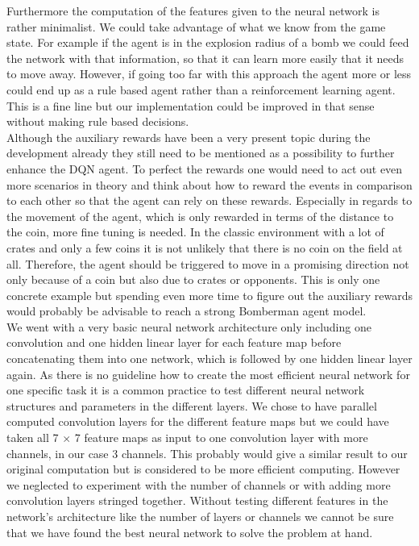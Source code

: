Furthermore the computation of the features given to the neural network is rather minimalist. We could take advantage of what we know from the game state. For example if the agent is in the explosion radius of a bomb we could feed the network with that information, so that it can learn more easily that it needs to move away. However, if going too far with this approach the agent more or less could end up as a rule based agent rather than a reinforcement learning agent. This is a fine line but our implementation could be improved in that sense without making rule based decisions.\\ 

Although the auxiliary rewards have been a very present topic during the development already they still need to be mentioned as a possibility to further enhance the DQN agent. To perfect the rewards one would need to act out even more scenarios in theory and think about how to reward the events in comparison to each other so that the agent can rely on these rewards. Especially in regards to the movement of the agent, which is only rewarded in terms of the distance to the coin, more fine tuning is needed. In the classic environment with a lot of crates and only a few coins it is not unlikely that there is no coin on the field at all. Therefore, the agent should be triggered to move in a promising direction not only because of a coin but also due to crates or opponents. This is only one concrete example but spending even more time to figure out the auxiliary rewards would probably be advisable to reach a strong Bomberman agent model. \\

We went with a very basic neural network architecture only including one convolution and one hidden linear layer for each feature map before concatenating them into one network, which is followed by one hidden linear layer again. As there is no guideline how to create the most efficient neural network for one specific task it is a common practice to test different neural network structures and parameters in the different layers. We chose to have parallel computed convolution layers for the different feature maps but we could have taken all 7 $\times$ 7 feature maps as input to one convolution layer with more channels, in our case 3 channels. This probably would give a similar result to our original computation but is considered to be more efficient computing. However we neglected to experiment with the number of channels or with adding more convolution layers stringed together. Without testing different features in the network's architecture like the number of layers or channels we cannot be sure that we have found the best neural network to solve the problem at hand.

